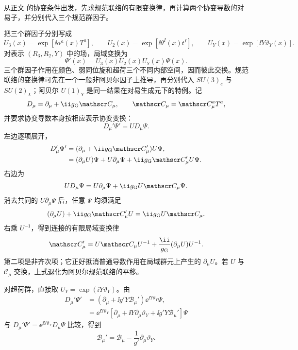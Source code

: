 

\begin{derivation}
从正文 的协变条件出发，先求规范联络的有限变换律，再计算两个协变导数的对易子，并分别代入三个规范群因子。

把三个群因子分别写成
\begin{equation*}
 U_3(x)=\exp[\ii\alpha^a(x)T^a],\qquad
 U_2(x)=\exp[\ii\theta^I(x)t^I],\qquad
 U_Y(x)=\exp[\ii Y\vartheta_Y(x)].
\end{equation*}
对表示 $(R_3,R_2,Y)$ 中的场，局域变换为
\begin{equation*}
 \Psi'(x)=U_3(x)U_2(x)U_Y(x)\Psi(x).
\end{equation*}
三个群因子作用在颜色、弱同位旋和超荷三个不同内部空间，因而彼此交换。规范联络的变换律可先在一个一般非阿贝尔因子上推导，再分别代入 $SU(3)_c$ 与 $SU(2)_L$；阿贝尔 $U(1)_Y$ 是同一结果在对易生成元下的特例。记
\begin{equation*}
 D_\mu=\partial_\mu+\ii g_{\rm G}\mathscr C_\mu,
 \qquad \mathscr C_\mu=\mathscr C_\mu^aT^a,
\end{equation*}
并要求协变导数本身按相应表示协变变换：
\begin{equation*}
 D_\mu'\Psi'=U D_\mu\Psi.
\end{equation*}
左边逐项展开，
\begin{align*}
 D_\mu'\Psi'
 &=(\partial_\mu+\ii g_{\rm G}\mathscr C_\mu')U\Psi,\\
 &=(\partial_\mu U)\Psi+U\partial_\mu\Psi
   +\ii g_{\rm G}\mathscr C_\mu'U\Psi.
\end{align*}
右边为
\begin{equation*}
 U D_\mu\Psi
 =U\partial_\mu\Psi+\ii g_{\rm G}U\mathscr C_\mu\Psi.
\end{equation*}
消去共同的 $U\partial_\mu\Psi$ 后，任意 $\Psi$ 均须满足
\begin{equation*}
 (\partial_\mu U)+\ii g_{\rm G}\mathscr C_\mu'U
 =\ii g_{\rm G}U\mathscr C_\mu.
\end{equation*}
右乘 $U^{-1}$，得到连接的有限局域变换律
\begin{equation*}
 {
 \mathscr C_\mu'
 =U\mathscr C_\mu U^{-1}
 +\frac{\ii}{g_{\rm G}}(\partial_\mu U)U^{-1}.}
\end{equation*}
第二项是非齐次项；它正好抵消普通导数作用在局域群元上产生的 $\partial_\mu U$。若 $U$ 与 $\mathscr C_\mu$ 交换，上式退化为阿贝尔规范联络的平移。

对超荷群，直接取 $U_Y=\exp(\ii Y\vartheta_Y)$。由
\begin{align*}
 D_\mu'\Psi'
 &=\left(\partial_\mu+\ii g'Y\mathcal B_\mu'\right)
   \ee^{\ii Y\vartheta_Y}\Psi,\\
 &=\ee^{\ii Y\vartheta_Y}
 \left[\partial_\mu+\ii Y\partial_\mu\vartheta_Y
 +\ii g'Y\mathcal B_\mu'\right]\Psi
\end{align*}
与 $D_\mu'\Psi'=\ee^{\ii Y\vartheta_Y}D_\mu\Psi$ 比较，得到
\begin{equation*}
 {
 \mathcal B_\mu'=\mathcal B_\mu-\frac1{g'}\partial_\mu\vartheta_Y.}
\end{equation*}


\end{derivation}
